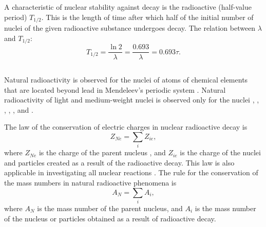 \subsection{}\label{42.4.5} 

A characteristic of nuclear stability against decay is the
radioactive  (half-value period) $T_{1/2}$. This is the length of time after which half of the initial number of nuclei of the given radioactive substance undergoes decay. The relation between $\lambda$ and
$T_{1/2}$:
\begin{equation*}%
T_{1/2} = \frac{\ln 2}{\lambda} = \frac{0.693}{\lambda}  = 0.693\tau .
\end{equation*}

\subsection{}\label{42.4.6} 

Natural radioactivity  is observed for the nuclei of atoms of chemical elements that are located beyond lead in Mendeleev's periodic system . Natural radioactivity of light and medium-weight nuclei is observed only for the nuclei , , , , ,  and .

The law of the conservation of electric charges  in nuclear radioactive decay is
\begin{equation*}%
Z_{Ne} = \sum_{i} Z_{ie},
\end{equation*}
where $Z_{Ne}$ is the charge of the parent nucleus , and $Z_{ie}$ is the charge of the nuclei and particles created as a result of the radioactive decay. This law is also applicable in investigating all nuclear reactions . The rule for the conservation of the mass numbers  in natural radioactive phenomena is
\begin{equation*}%
A_{N} = \sum_{i} A_{i},
\end{equation*}
where $A_{N}$ is the mass number of the parent nucleus, and $A_{i}$  is the mass number of the nucleus or particles obtained as a result of radioactive decay.

